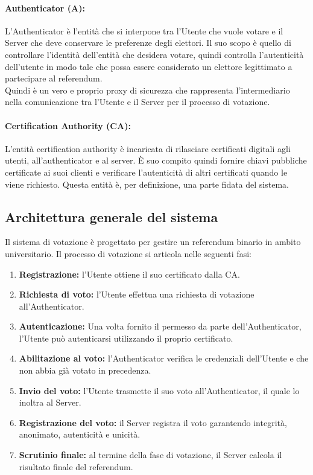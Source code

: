 	\paragraph{Authenticator (A):}
		L'Authenticator è l'entità che si interpone tra l'Utente che vuole votare e il Server che deve conservare le preferenze degli elettori. Il suo scopo è quello di controllare l'identità dell'entità che desidera votare, quindi controlla l'autenticità dell'utente in modo tale che possa essere considerato un elettore legittimato a partecipare al referendum.\\
		Quindi è un vero e proprio proxy di sicurezza che rappresenta l'intermediario nella comunicazione tra l'Utente e il Server per il processo di votazione.
	
	\paragraph{Certification Authority (CA):}
		L'entità certification authority è incaricata di rilasciare certificati digitali agli utenti, all'authenticator e al server. È suo compito quindi fornire chiavi pubbliche certificate ai suoi clienti e verificare l'autenticità di altri certificati quando le viene richiesto. Questa entità è, per definizione, una parte fidata del sistema.

\subsection{Architettura generale del sistema}
	Il sistema di votazione è progettato per gestire un referendum binario in ambito universitario. Il processo di votazione si articola nelle seguenti fasi:
	
	\begin{enumerate}
		\item \textbf{Registrazione:} l'Utente ottiene il suo certificato dalla CA.
		\item \textbf{Richiesta di voto:} l'Utente effettua una richiesta di votazione all'Authenticator.
		\item \textbf{Autenticazione: } Una volta fornito il permesso da parte dell'Authenticator, l'Utente può autenticarsi utilizzando il proprio certificato.
		\item \textbf{Abilitazione al voto: } l'Authenticator verifica le credenziali dell'Utente e che non abbia già votato in precedenza.
		\item \textbf{Invio del voto: } l'Utente trasmette il suo voto all'Authenticator, il quale lo inoltra al Server.
		\item \textbf{Registrazione del voto: } il Server registra il voto garantendo integrità, anonimato, autenticità e unicità.
		\item \textbf{Scrutinio finale: } al termine della fase di votazione, il Server calcola il risultato finale del referendum.
	\end{enumerate}
	
